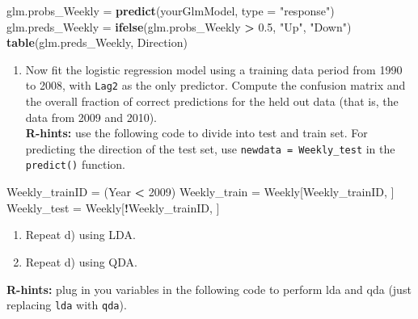 \documentclass[]{article}
\newenvironment{Shaded}{\begin{snugshade}}{\end{snugshade}}
\newcommand{\KeywordTok}[1]{\textcolor[rgb]{0.13,0.29,0.53}{\textbf{#1}}}
\newcommand{\DataTypeTok}[1]{\textcolor[rgb]{0.13,0.29,0.53}{#1}}
\newcommand{\DecValTok}[1]{\textcolor[rgb]{0.00,0.00,0.81}{#1}}
\newcommand{\FloatTok}[1]{\textcolor[rgb]{0.00,0.00,0.81}{#1}}
\newcommand{\StringTok}[1]{\textcolor[rgb]{0.31,0.60,0.02}{#1}}
\newcommand{\OperatorTok}[1]{\textcolor[rgb]{0.81,0.36,0.00}{\textbf{#1}}}
\newcommand{\NormalTok}[1]{#1}
\providecommand{\tightlist}{%
  \setlength{\itemsep}{0pt}\setlength{\parskip}{0pt}}
\begin{document}
\begin{Shaded}
\begin{Highlighting}[]
\NormalTok{glm.probs_Weekly =}\StringTok{ }\KeywordTok{predict}\NormalTok{(yourGlmModel, }\DataTypeTok{type =} \StringTok{"response"}\NormalTok{)}
\NormalTok{glm.preds_Weekly =}\StringTok{ }\KeywordTok{ifelse}\NormalTok{(glm.probs_Weekly }\OperatorTok{>}\StringTok{ }\FloatTok{0.5}\NormalTok{, }\StringTok{"Up"}\NormalTok{, }\StringTok{"Down"}\NormalTok{)}
\KeywordTok{table}\NormalTok{(glm.preds_Weekly, Direction)}
\end{Highlighting}
\end{Shaded}

\begin{enumerate}
\def\labelenumi{\alph{enumi}.}
\setcounter{enumi}{3}
\tightlist
\item
  Now fit the logistic regression model using a training data period
  from 1990 to 2008, with \texttt{Lag2} as the only predictor. Compute
  the confusion matrix and the overall fraction of correct predictions
  for the held out data (that is, the data from 2009 and 2010).\\
  \textbf{R-hints:} use the following code to divide into test and train
  set. For predicting the direction of the test set, use
  \texttt{newdata\ =\ Weekly\_test} in the \texttt{predict()} function.
\end{enumerate}

\begin{Shaded}
\begin{Highlighting}[]
\NormalTok{Weekly_trainID =}\StringTok{ }\NormalTok{(Year }\OperatorTok{<}\StringTok{ }\DecValTok{2009}\NormalTok{)}
\NormalTok{Weekly_train =}\StringTok{ }\NormalTok{Weekly[Weekly_trainID, ]}
\NormalTok{Weekly_test =}\StringTok{ }\NormalTok{Weekly[}\OperatorTok{!}\NormalTok{Weekly_trainID, ]}
\end{Highlighting}
\end{Shaded}

\begin{enumerate}
\def\labelenumi{\alph{enumi}.}
\setcounter{enumi}{4}
\tightlist
\item
  Repeat d) using LDA.
\item
  Repeat d) using QDA.
\end{enumerate}

\textbf{R-hints:} plug in you variables in the following code to perform
lda and qda (just replacing \texttt{lda} with \texttt{qda}).
\end{document}
